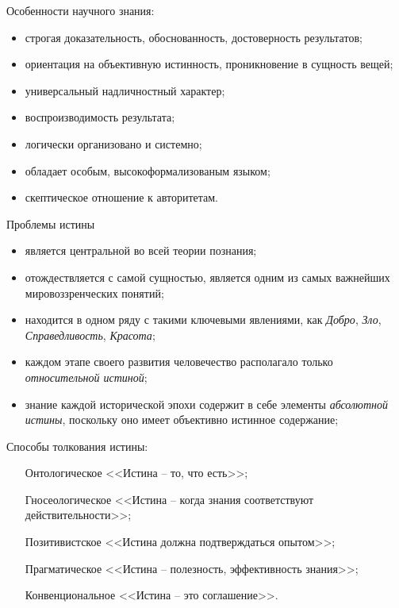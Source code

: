 Особенности научного знания:
\begin{itemize}
    \item строгая доказательность, обоснованность, достоверность результатов;
    \item ориентация на объективную истинность, проникновение в сущность вещей;
    \item универсальный надличностный характер;
    \item воспроизводимость результата;
    \item логически организовано и системно;
    \item обладает особым, высокоформализованым языком;
    \item скептическое отношение к авторитетам.
\end{itemize}

Проблемы истины
\begin{itemize}
    \item является центральной во всей теории познания;
    \item отождествляется с самой сущностью, является одним из самых важнейших мировоззренческих понятий;
    \item находится в одном ряду с такими ключевыми явлениями, как \emph{Добро}, \emph{Зло}, 
        \emph{Справедливость}, \emph{Красота};
    \item каждом этапе своего развития человечество располагало только \emph{относительной истиной};
    \item знание каждой исторической эпохи содержит в себе элементы \emph{абсолютной истины}, поскольку оно 
        имеет объективно истинное содержание;
\end{itemize}

Способы толкования истины:
\begin{itemize}
    \item[Онтологическое] <<Истина -- то, что есть>>;
    \item[Гносеологическое] <<Истина -- когда знания соответствуют действительности>>;
    \item[Позитивистское] <<Истина должна подтверждаться опытом>>;
    \item[Прагматическое] <<Истина -- полезность, эффективность знания>>;
    \item[Конвенциональное] <<Истина -- это соглашение>>.
\end{itemize}


